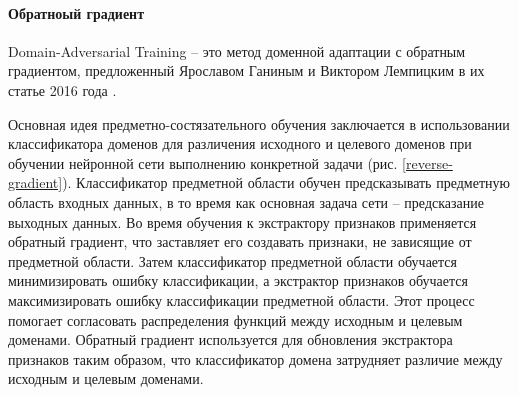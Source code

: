 \paragraph{Обратноый градиент}

Domain-Adversarial Training -- это метод доменной адаптации с обратным градиентом, предложенный Ярославом Ганиным и Виктором Лемпицким в их статье 2016 года \cite{lib-reverse-gradient}.


Основная идея предметно-состязательного обучения заключается в использовании классификатора доменов для различения исходного и целевого доменов при обучении нейронной сети выполнению конкретной задачи (рис. \ref{reverse-gradient}). Классификатор предметной области обучен предсказывать предметную область входных данных, в то время как основная задача сети -- предсказание выходных данных. Во время обучения к экстрактору признаков применяется обратный градиент, что заставляет его создавать признаки, не зависящие от предметной области. Затем классификатор предметной области обучается минимизировать ошибку классификации, а экстрактор признаков обучается максимизировать ошибку классификации предметной области. Этот процесс помогает согласовать распределения функций между исходным и целевым доменами. Обратный градиент используется для обновления экстрактора признаков таким образом, что классификатор домена затрудняет различие между исходным и целевым доменами. 